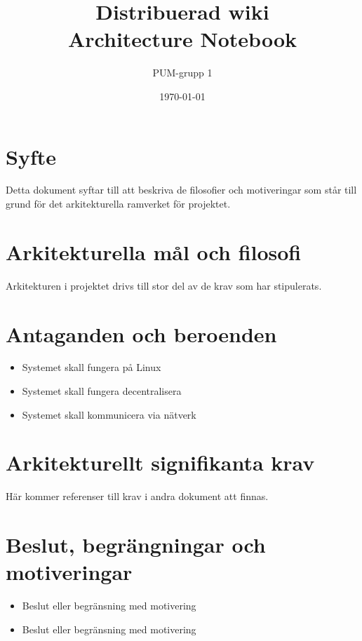 

\ifpdf
\else
\fi

\title{Distribuerad wiki \\ Architecture Notebook}
\author{PUM-grupp 1}
\date{\today}



\maketitle

\thispagestyle{empty}
\newpage
\section{Syfte}
Detta dokument syftar till att beskriva de filosofier och motiveringar som står till grund för det arkitekturella ramverket för projektet.
\section{Arkitekturella mål och filosofi}
Arkitekturen i projektet drivs till stor del av de krav som har stipulerats.
\section{Antaganden och beroenden}
\begin{itemize}
\item Systemet skall fungera på Linux
\item Systemet skall fungera decentralisera
\item Systemet skall kommunicera via nätverk
\end{itemize}
\section{Arkitekturellt signifikanta krav}
Här kommer referenser till krav i andra dokument att finnas.
\section{Beslut, begrängningar och motiveringar}
\begin{itemize}
\item Beslut eller begränsning med motivering
\item Beslut eller begränsning med motivering
\end{itemize}
